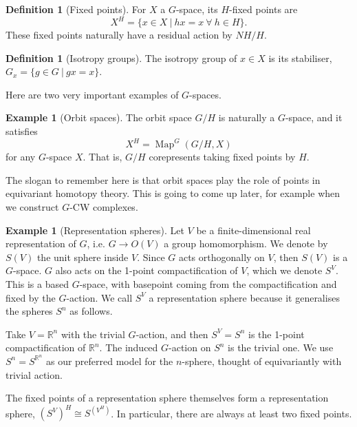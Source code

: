 \documentclass{amsart}
\theoremstyle{definition}
\newtheorem{defn}[thm]{Definition}
\newtheorem{example}[thm]{Example}
\numberwithin{thm}{section}
\def\R{\mathbb{R}}
\def\Map{\operatorname{Map}}
\begin{document}
\begin{defn}[Fixed points] For $X$ a $G$-space, its $H$-fixed points are 
    \[X^H = \{x \in X~|~ hx = x ~\forall~ h \in H\}.\] 
    These fixed points naturally have a residual action by $NH/H$. 
\end{defn}

\begin{defn}[Isotropy groups] 
    The isotropy group of $x \in X$ is its stabiliser, $G_x = \{g \in G ~|~ gx = x\}$.
\end{defn}

Here are two very important examples of $G$-spaces.

\begin{example}[Orbit spaces]
    The orbit space $G/H$ is naturally a $G$-space, and it satisfies
    \[X^H = \Map^G(G/H, X)\]
    for any $G$-space $X$. That is, $G/H$ corepresents taking fixed points by $H$. 
\end{example}

The slogan to remember here is that orbit spaces play the role of points in equivariant homotopy theory. This is going to come up later, for example when we construct $G$-CW complexes. 

\begin{example}[Representation spheres]
    Let $V$ be a finite-dimensional real representation of $G$, i.e. $G \to O(V)$ a group homomorphism. We denote by $S(V)$ the unit sphere inside $V$. Since $G$ acts orthogonally on $V$, then $S(V)$ is a $G$-space. $G$ also acts on the 1-point compactification of $V$, which we denote $S^V$. This is a based $G$-space, with basepoint coming from the compactification and fixed by the $G$-action. We call $S^V$ a representation sphere because it generalises the spheres $S^n$ as follows. 

    Take $V = \R^n$ with the trivial $G$-action, and then $S^V = S^n$ is the 1-point compactification of $\R^n$. The induced $G$-action on $S^n$ is the trivial one. We use $S^n = S^{\R^n}$ as our preferred model for the $n$-sphere, thought of equivariantly with trivial action. 

    The fixed points of a representation sphere themselves form a representation sphere, $(S^V)^H \cong S^{(V^H)}$. In particular, there are always at least two fixed points.
\end{example}
\end{document}
